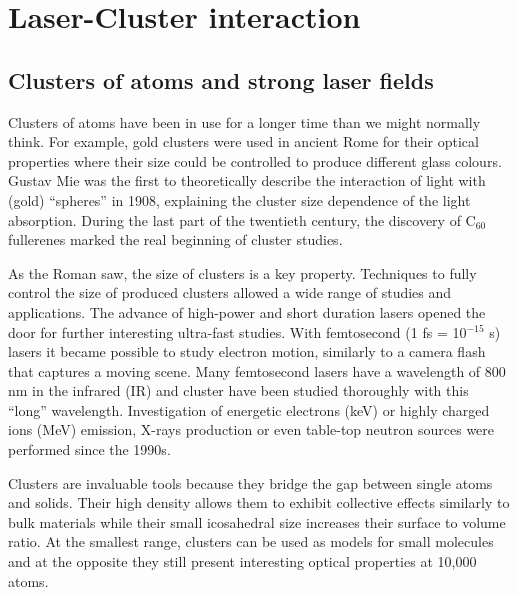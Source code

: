 
\section{Laser-Cluster interaction}


\subsection{Clusters of atoms and strong laser fields}

Clusters of atoms have been in use for a longer time than we might normally
think. For example, gold clusters were used in ancient Rome for their optical
properties where their size could be controlled to produce different glass colours.
Gustav Mie was the first to theoretically describe the interaction of light
with (gold) ``spheres'' in 1908, explaining the cluster size dependence of the
light absorption. During the last part of the twentieth century, the discovery of
C$_{60}$ fullerenes marked the real beginning of cluster studies.

As the Roman saw, the size of clusters is a key property. Techniques to fully
control the size of produced clusters allowed a wide range of studies and
applications. The advance of high-power and short duration lasers opened the
door for further interesting ultra-fast studies. With femtosecond
(1 fs = 10$^{-15}$ s) lasers it became possible to study electron motion,
similarly to a camera flash that captures a moving scene. Many femtosecond lasers
have a wavelength of 800 nm in the infrared (IR) and cluster have been studied
thoroughly with this ``long'' wavelength. Investigation of energetic
electrons (keV) or highly charged ions (MeV) emission, X-rays production or even
table-top neutron sources\cite{Krainov2007} were performed since the
1990s\cite{Haberland1994,Brabec2009}.

Clusters are invaluable tools because they bridge the gap between single atoms
and solids. Their high density allows them to exhibit collective effects similarly
to bulk materials while their small icosahedral\cite{Martin1996} size increases
their surface to volume ratio.
At the smallest range, clusters can be used as models for small molecules and
at the opposite they still present interesting optical properties at 10,000
atoms\cite{Reinhard2004}.

